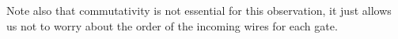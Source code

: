 \documentclass[review,onefignum,onetabnum]{siamart190516}
\begin{document}
Note also that commutativity is not essential for this observation, it just
allows us not to worry about the order of the incoming wires for each gate.


%
%
%
%
%
%
%
\end{document}
